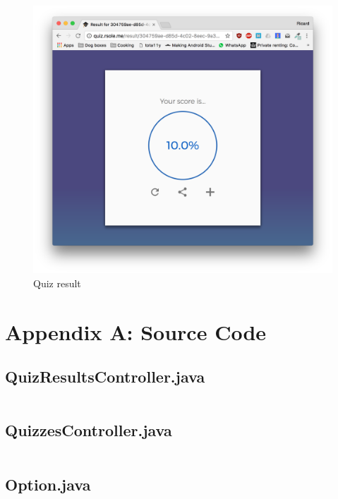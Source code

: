 \documentclass[english,a4paper,]{report}
\begin{document}
\begin{figure}
\centering
\includegraphics{report/images/03.png}
\caption{Quiz result\label{fig:4}}
\end{figure}

\chapter{Appendix A: Source Code}\label{appendix-a-source-code}

\section{QuizResultsController.java}\label{quizresultscontroller.java}

\inputminted{java}{app/controllers/QuizResultsController.java}

\section{QuizzesController.java}\label{quizzescontroller.java}

\inputminted{java}{app/controllers/QuizzesController.java}

\section{Option.java}\label{option.java}

\inputminted{java}{app/models/Option.java}
\end{document}
